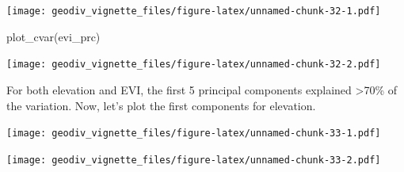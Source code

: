 \documentclass[
]{article}
\newenvironment{Shaded}{\begin{snugshade}}{\end{snugshade}}
\newcommand{\AttributeTok}[1]{\textcolor[rgb]{0.77,0.63,0.00}{#1}}
\newcommand{\CommentTok}[1]{\textcolor[rgb]{0.56,0.35,0.01}{\textit{#1}}}
\newcommand{\DecValTok}[1]{\textcolor[rgb]{0.00,0.00,0.81}{#1}}
\newcommand{\FunctionTok}[1]{\textcolor[rgb]{0.00,0.00,0.00}{#1}}
\newcommand{\NormalTok}[1]{#1}
\newcommand{\SpecialCharTok}[1]{\textcolor[rgb]{0.00,0.00,0.00}{#1}}
\newcommand{\StringTok}[1]{\textcolor[rgb]{0.31,0.60,0.02}{#1}}
\begin{document}
\texttt{[image: geodiv\_vignette\_files/figure-latex/unnamed-chunk-32-1.pdf]}

\begin{Shaded}
\begin{Highlighting}[]
\FunctionTok{plot\_cvar}\NormalTok{(evi\_prc)}
\end{Highlighting}
\end{Shaded}

\texttt{[image: geodiv\_vignette\_files/figure-latex/unnamed-chunk-32-2.pdf]}

For both elevation and EVI, the first 5 principal components explained
\textgreater70\% of the variation. Now, let's plot the first components
for elevation.

\begin{Shaded}
\end{Shaded}

\texttt{[image: geodiv\_vignette\_files/figure-latex/unnamed-chunk-33-1.pdf]}

\begin{Shaded}
\end{Shaded}

\texttt{[image: geodiv\_vignette\_files/figure-latex/unnamed-chunk-33-2.pdf]}

\begin{Shaded}
\end{Shaded}
\end{document}
